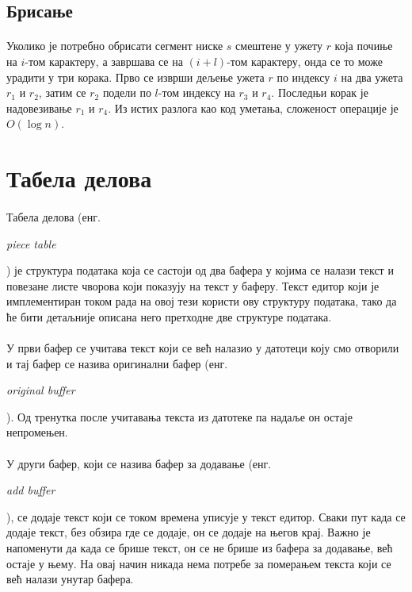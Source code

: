\documentclass[12pt,oneside]{memoir}
\begin{document}
\subsection{Брисање}
\paragraph{}
Уколико је потребно обрисати сегмент ниске \(s\) смештене у ужету \(r\) која почиње на \(i\)-том
карактеру, а завршава се на \((i+l)\)-том карактеру, онда се то може урадити у три корака. 
Прво се изврши дељење ужета \(r\) по индексу \(i\) на два ужета \(r_1\) и \(r_2\), затим се \(r_2\)
подели по \(l\)-том индексу на \(r_3\) и \(r_4\). Последњи корак је надовезивање \(r_1\) и \(r_4\). 
Из истих разлога као код уметања, сложеност операције је \(O(\log{}n)\).

\section{Табела делова}
\paragraph{}
Табела делова (енг. \begin{latinica}\textit{piece table}\end{latinica}) је структура података
која се састоји од два бафера у којима се налази текст и повезане листе чворова који показују
на текст у баферу. Текст едитор који је имплементиран током рада на овој тези користи ову структуру
података, тако да ће бити детаљније описана него претходне две структуре података.

\paragraph{}
У први бафер се учитава текст који се већ налазио у датотеци коју смо
отворили и тај бафер се назива оригинални бафер (енг. \begin{latinica}\textit{original buffer}\end{latinica}). Од тренутка после учитавања текста из датотеке па надаље он остаје непромењен. 

\paragraph{}
У други бафер, који се назива бафер за додавање (енг. \begin{latinica}\textit{add buffer}\end{latinica}), 
се додаје текст који се током времена уписује у текст едитор. Сваки пут
када се додаје текст, без обзира где се додаје, он се додаје на његов крај. 
Важно је напоменути да када се брише текст, он се не брише из бафера за додавање, већ остаје у њему. 
На овај начин никада нема потребе за померањем текста који се већ налази унутар бафера.
\end{document}
